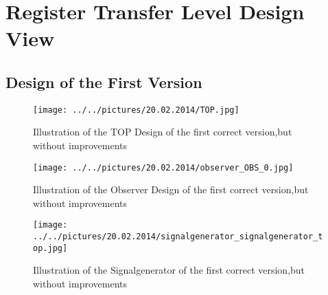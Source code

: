 
\chapter{Register Transfer Level Design View}
\label{appendix:3}
\section{Design of the First Version}
\begin{figure}[h]
\centering
\texttt{[image: ../../pictures/20.02.2014/TOP.jpg]}
\caption[TOP Design of the First Version]{Illustration of the TOP Design of the first correct version,but without improvements}
\label{fig:version:one:top}
\end{figure}

\begin{figure}[h]
\centering
\texttt{[image: ../../pictures/20.02.2014/observer\_OBS\_0.jpg]}
\caption[Observer Design of the First Version]{Illustration of the Observer Design of the first correct version,but without improvements}
\label{fig:version:one:obs}
\end{figure}

\begin{figure}[h]
\centering
\texttt{[image: ../../pictures/20.02.2014/signalgenerator\_signalgenerator\_top.jpg]}
\caption[Signalgenerator of the First Version]{Illustration of the Signalgenerator of the first correct version,but without improvements}
\label{fig:version:one:sig}
\end{figure}
